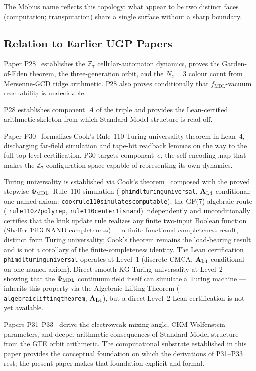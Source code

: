 \documentclass[12pt,letterpaper]{article}
\newcommand{\fmdl}{f_{\mathrm{MDL}}}
\newcommand{\Zseven}{\mathbb{Z}_7}
\newcommand{\catAL}{\ensuremath{\textbf{A}_{\rm L4}}}
\newcommand{\lean}[1]{%
  \penalty-100
  \begingroup\def\_{\textunderscore\allowbreak}\texttt{#1}\endgroup}
\begin{document}
The M\"{o}bius name reflects this topology: what appear to be two distinct faces
(computation; transputation) share a single surface without a sharp boundary.

\subsection{Relation to Earlier UGP Papers}
\label{sec:prior-papers}

Paper P28~\cite{SpivackCompUniversality} establishes the $\Zseven$ cellular-automaton dynamics, proves
the Garden-of-Eden theorem, the three-generation orbit, and the $N_c = 3$ colour count
from Mersenne-GCD ridge arithmetic.  P28 also proves conditionally that
$\fmdl$-vacuum reachability is undecidable.

P28 establishes component~$A$ of the triple and provides the Lean-certified
arithmetic skeleton from which Standard Model structure is read off.

Paper P30~\cite{SpivackCookTheorem} formalizes Cook's Rule~110 Turing universality theorem in
Lean~4, discharging far-field simulation and tape-bit readback lemmas on the way
to the full top-level certification.  P30 targets component~$e$, the self-encoding
map that makes the $\Zseven$ configuration space capable of representing its own
dynamics.

Turing universality is established via Cook's theorem~\cite{Cook2004} composed with
the proved stepwise $\Phi_{\rm MDL}$--Rule~110 simulation
(\lean{phimdl\_turing\_universal}, \catAL{} conditional; one named axiom:
\lean{cook\_rule110\_simulates\_computable}); the GF(7) algebraic route
(\lean{rule110\_z7\_poly\_rep}, \lean{rule110\_center1\_is\_nand}) independently and
unconditionally certifies that the kink update rule realizes any finite two-input
Boolean function (Sheffer 1913 NAND completeness) --- a finite functional-completeness
result, distinct from Turing universality; Cook's theorem remains the load-bearing
result and is not a corollary of the finite-completeness identity.
The Lean certification \lean{phimdl\_turing\_universal} operates at Level~1 (discrete
CMCA, \catAL{} conditional on one named axiom).  Direct smooth-KG Turing universality
at Level~2 --- showing that the $\Phi_{\rm MDL}$ continuum field itself can simulate a
Turing machine --- inherits this property via the Algebraic Lifting Theorem
(\lean{algebraic\_lifting\_theorem}, \catAL{}), but a direct Level~2 Lean
certification is not yet available.

Papers P31--P33~\cite{SpivackWeinbergAngle,SpivackCKM,SpivackDeeperConsequences} derive the electroweak mixing angle, CKM
Wolfenstein parameters, and deeper arithmetic consequences of Standard Model structure
from the GTE orbit arithmetic.  The computational substrate established in this paper provides the conceptual foundation on which the derivations of P31--P33 rest; the present paper makes that foundation explicit and formal.
\end{document}
